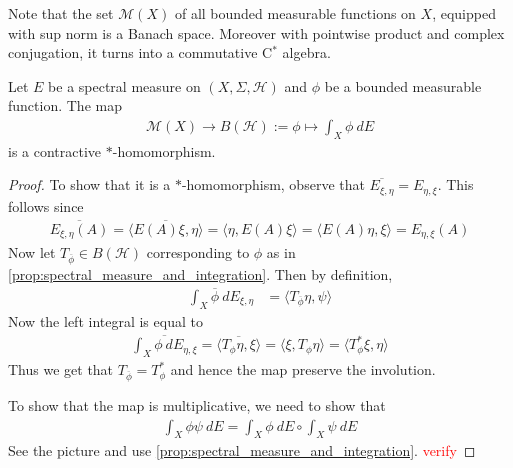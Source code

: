 Note that the set $\mathcal{M}(X)$ of all bounded measurable functions on $X$,
equipped with sup norm is a Banach space. Moreover with pointwise
product and complex conjugation, it turns into a commutative C$^*$ algebra.

\begin{theorem}
  Let $E$ be a spectral measure on $(X, \Sigma, \mathcal{H})$ and
  \marginnote{ \scriptsize \it \textcolor{red}{verify if $\phi$ is a
  linear functional}}
  $\phi$ be a bounded measurable function. The map
  \begin{align*}
    \mathcal{M}(X) \to B(\mathcal{H}):= \phi \mapsto \int_ X \phi \ d E
  \end{align*}
  is a contractive $*$-homomorphism.
\end{theorem}
\begin{proof}
  To show that it is a $*$-homomorphism, observe that
  $\overline{E_{\xi, \eta}} = E_{\eta, \xi}$. This follows since
  \begin{align*}
    \overline{E_{\xi, \eta}(A)} = \overline{ \langle E(A) \xi , \eta
    \rangle } = \langle \eta , E(A) \xi \rangle = \langle E(A)  \eta , \xi
    \rangle = E_{\eta,  \xi}(A)
  \end{align*}
  Now let $T_{\overline{\phi}} \in B(\mathcal{H})$ corresponding to
  $\phi$ as in \autoref{prop:spectral_measure_and_integration}. Then
  by definition,
  \begin{align*}
    \int_X \overline{\phi} \ d  E_{\xi, \eta} &= \langle T_{\overline{
    \phi}}  \eta, \psi  \rangle
  \end{align*}
  Now the left integral is equal to
  \begin{align*}
    \overline{\int_X  \phi \ d E_{\eta, \xi}} = \overline{\langle
    T_{\phi} \eta ,  \xi \rangle } = \langle \xi ,  T_\phi \eta
    \rangle = \langle T_\phi^* \xi ,  \eta \rangle
  \end{align*}
  Thus we get that $T_{\overline{\phi}} = T_{\phi}^*$ and hence the
  map preserve the involution.

  To show that the map is multiplicative, we need to show that
  \begin{align*}
    \int_X \phi \psi \ d  E = \int_X \phi \ d  E \circ \int_X \psi \ d  E
  \end{align*}
  See the picture and use
  \autoref{prop:spectral_measure_and_integration}. \textcolor{red}{verify}
\end{proof}


